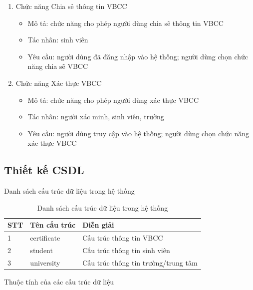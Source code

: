 \begin{enumerate}
\item 
Chức năng Chia sẻ thông tin VBCC
\begin{itemize}
\item Mô tả: chức năng cho phép người dùng chia sẽ thông tin VBCC 
\item Tác nhân: sinh viên 
\item Yêu cầu: người dùng đã đăng nhập vào hệ thống; người dùng chọn chức năng chia sẽ VBCC
\end{itemize}

\item 
Chức năng Xác thực VBCC
\begin{itemize}
\item Mô tả: chức năng cho phép người dùng xác thực VBCC
\item Tác nhân: người xác minh, sinh viên, trường 
\item Yêu cầu: người dùng truy cập vào hệ thống; người dùng chọn chức năng xác thực VBCC
\end{itemize}

\end{enumerate}

\subsection{Thiết kế CSDL}

Danh sách cấu trúc dữ liệu trong hệ thống

\begin{table}[H]
\caption{Danh sách cấu trúc dữ liệu trong hệ thống}
	\label{table:dataschema}
	\begin{tabularx} {\textwidth} {|p{1cm}|p{3cm}|X|}
\hline
		STT &	Tên cấu trúc & Diễn giải \\ \hline
		1 & certificate	& Cấu trúc thông tin VBCC\\ \hline
		2 & student & Cấu trúc thông tin sinh viên \\ \hline
		3 & university	&Cấu trúc thông tin trường/trung tâm \\ \hline
	\end{tabularx}
\end{table}

Thuộc tính của các cấu trúc dữ liệu

